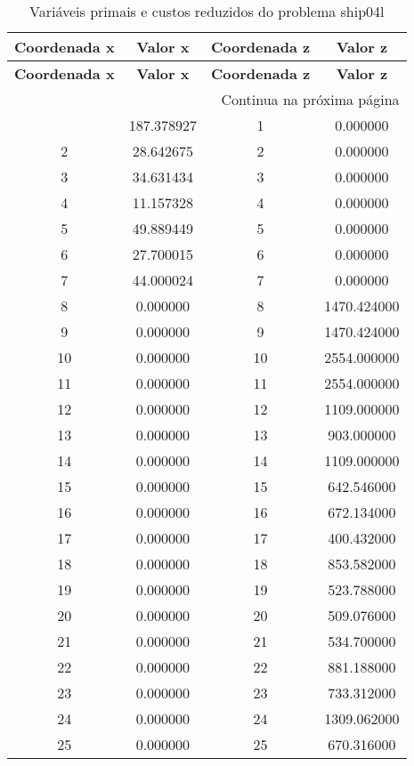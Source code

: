 \documentclass[12pt]{article}
\begin{document}
\begin{longtable}{@{}cccc@{}}
\caption{Variáveis primais e custos reduzidos do problema ship04l} \\
\toprule
\textbf{Coordenada x} & \textbf{Valor x} & \textbf{Coordenada z} & \textbf{Valor z} \\
\midrule
\endfirsthead

\toprule
\textbf{Coordenada x} & \textbf{Valor x} & \textbf{Coordenada z} & \textbf{Valor z} \\
\midrule
\endhead

\midrule \multicolumn{4}{r}{{Continua na próxima página}} \\ \midrule
\endfoot

\bottomrule
\endlastfoot
1 & 187.378927 & 1 & 0.000000 \\
2 & 28.642675 & 2 & 0.000000 \\
3 & 34.631434 & 3 & 0.000000 \\
4 & 11.157328 & 4 & 0.000000 \\
5 & 49.889449 & 5 & 0.000000 \\
6 & 27.700015 & 6 & 0.000000 \\
7 & 44.000024 & 7 & 0.000000 \\
8 & 0.000000 & 8 & 1470.424000 \\
9 & 0.000000 & 9 & 1470.424000 \\
10 & 0.000000 & 10 & 2554.000000 \\
11 & 0.000000 & 11 & 2554.000000 \\
12 & 0.000000 & 12 & 1109.000000 \\
13 & 0.000000 & 13 & 903.000000 \\
14 & 0.000000 & 14 & 1109.000000 \\
15 & 0.000000 & 15 & 642.546000 \\
16 & 0.000000 & 16 & 672.134000 \\
17 & 0.000000 & 17 & 400.432000 \\
18 & 0.000000 & 18 & 853.582000 \\
19 & 0.000000 & 19 & 523.788000 \\
20 & 0.000000 & 20 & 509.076000 \\
21 & 0.000000 & 21 & 534.700000 \\
22 & 0.000000 & 22 & 881.188000 \\
23 & 0.000000 & 23 & 733.312000 \\
24 & 0.000000 & 24 & 1309.062000 \\
25 & 0.000000 & 25 & 670.316000 \\

\end{longtable}
\end{document}
